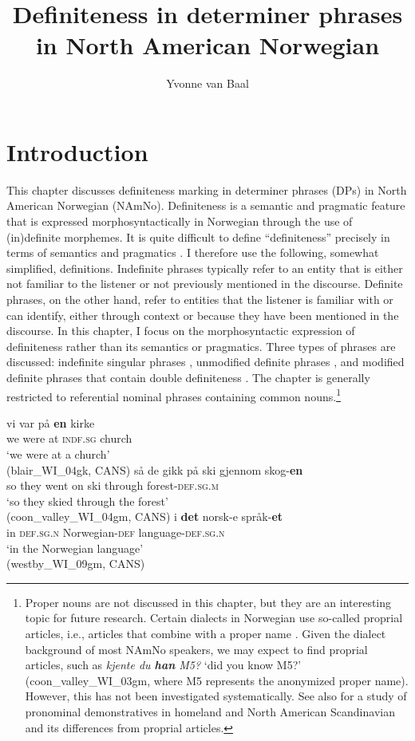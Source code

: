 \documentclass[output=paper]{langscibook}
\author{Yvonne van Baal\orcid{0000-0002-1766-2911}\affiliation{University of Stavanger}}
\title{Definiteness in determiner phrases in North American Norwegian}
\begin{document}
\maketitle

\section{Introduction} \label{Sect-Introduction}
This chapter discusses definiteness marking in determiner phrases (DPs) in North American Norwegian (NAmNo). Definiteness is a semantic and pragmatic feature that is expressed morphosyntactically in Norwegian through the use of (in)definite morphemes. It is quite difficult to define ``definiteness'' precisely in terms of semantics and pragmatics \citep[253]{Lyons1999}. I therefore use the following, somewhat simplified, definitions. Indefinite phrases typically refer to an entity that is either not familiar to the listener or not previously mentioned in the discourse. Definite phrases, on the other hand, refer to entities that the listener is familiar with or can identify, either through context or because they have been mentioned in the discourse. In this chapter, I focus on the morphosyntactic expression of definiteness rather than its semantics or pragmatics. Three types of phrases are discussed: indefinite singular phrases , unmodified definite phrases , and modified definite phrases that contain double definiteness . The chapter is generally restricted to referential nominal phrases containing common nouns.\footnote{Proper nouns are not discussed in this chapter, but they are an interesting topic for future research. Certain dialects in Norwegian use so-called proprial articles, i.e., articles that combine with a proper name \citep[see][]{JohannessenGarbacz2014}. Given the dialect background of most NAmNo speakers, we may expect to find proprial articles, such as \textit{kjente du \textbf{han} M5?} `did you know M5?' (coon\_valley\_WI\_03gm, where M5 represents the anonymized proper name). However, this has not been investigated systematically. See also \citet{KinnLarsson2022} for a study of pronominal demonstratives in homeland and North American Scandinavian and its differences from proprial articles.} 

\ea\label{ex:vanbaal:1}
\ea\label{ex:vanbaal:1a}
\gll vi var på \textbf{en} kirke \\
we were at \textsc{indf.sg} church \\
\glt `we were at a church' \\
(blair\_WI\_04gk, CANS)
\ex\label{ex:vanbaal:1b}
\gll så de gikk på ski gjennom skog-\textbf{en} \\
so they went on ski through forest-\textsc{def.sg.m} \\
\glt `so they skied through the forest' \\
(coon\_valley\_WI\_04gm, CANS)
\ex \label{ex:vanbaal:1c}
\gll i \textbf{det} norsk-e språk-\textbf{et} \\
in \textsc{def.sg.n} Norwegian-\textsc{def} language-\textsc{def.sg.n} \\
\glt `in the Norwegian language' \\
(westby\_WI\_09gm, CANS)
\z
\z
\end{document}
